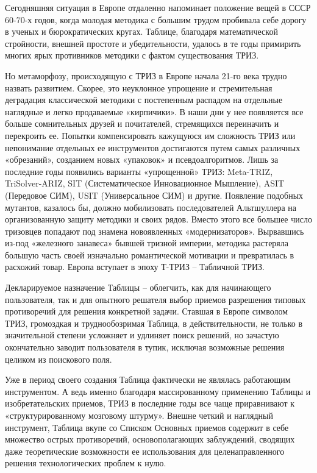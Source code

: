 \documentclass[11pt,a4paper]{article}
\begin{document}
Сегодняшняя ситуация в Европе отдаленно напоминает положение вещей в СССР
60-70-х годов, когда молодая методика с большим трудом пробивала себе дорогу в
ученых и бюрократических кругах. Таблице, благодаря математической стройности,
внешней простоте и убедительности, удалось в те годы примирить многих ярых
противников методики с фактом существования ТРИЗ.

Но метаморфозу, происходящую с ТРИЗ в Европе начала 21-го века трудно назвать
развитием. Скорее, это неуклонное упрощение и стремительная деградация
классической методики с постепенным распадом на отдельные наглядные и легко
продаваемые «кирпичики». В наши дни у нее появляется все больше сомнительных
друзей и почитателей, стремящихся переиначить и перекроить ее. Попытки
компенсировать кажущуюся им сложность ТРИЗ или непонимание отдельных ее
инструментов достигаются путем самых различных «обрезаний», созданием новых
«упаковок» и псевдоалгоритмов. Лишь за последние годы появились варианты
«упрощенной» ТРИЗ: Meta-TRIZ, TriSolver-ARIZ, SIT (Систематическое
Инновационное Мышление), ASIT (Передовое СИМ), USIT (Универсальное СИМ) и
другие. Появление подобных мутантов, казалось бы, должно мобилизовать
последователей Альтшуллера на организованную защиту методики и своих
рядов. Вместо этого все большее число тризовцев попадают под знамена
новоявленных «модернизаторов». Вырвавшись из-под «железного занавеса» бывшей
тризной империи, методика растеряла большую часть своей изначально
романтической мотивации и превратилась в расхожий товар. Европа вступает в
эпоху Т-ТРИЗ -- Табличной ТРИЗ.

Декларируемое назначение Таблицы -- облегчить, как для начинающего
пользователя, так и для опытного решателя выбор приемов разрешения типовых
противоречий для решения конкретной задачи. Ставшая в Европе символом ТРИЗ,
громоздкая и труднообозримая Таблица, в действительности, не только в
значительной степени усложняет и удлиняет поиск решений, но зачастую
окончательно заводит пользователя в тупик, исключая возможные решения целиком
из поискового поля.

Уже в период своего создания Таблица фактически не являлась работающим
инструментом. А ведь именно благодаря массированному применению Таблицы и
изобретательских приемов, ТРИЗ в последние годы все чаще приравнивают к
«структурированному мозговому штурму». Внешне четкий и наглядный инструмент,
Таблица вкупе со Списком Основных приемов содержит в себе множество острых
противоречий, основополагающих заблуждений, сводящих даже теоретические
возможности ее использования для целенаправленного решения технологических
проблем к нулю.
\end{document}
